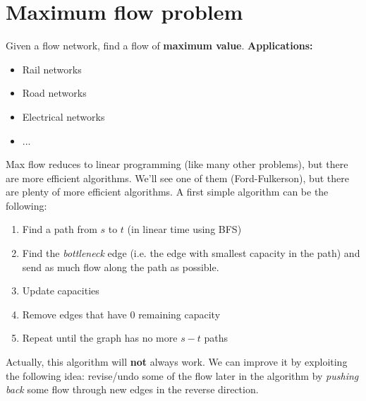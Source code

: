 \section{Maximum flow problem}
Given a flow network, find a flow of \textbf{maximum value}.\newline\newline
\textbf{Applications:}
\begin{itemize}
    \item Rail networks
    \item Road networks
    \item Electrical networks
    \item ...
\end{itemize}
Max flow reduces to linear programming (like many other problems), but there are more efficient algorithms. We'll see one of them (Ford-Fulkerson), but there are plenty of more efficient algorithms. \newline\newline
A first simple algorithm can be the following:
\begin{enumerate}
    \item Find a path from $s$ to $t$ (in linear time using BFS)
    \item Find the \textit{bottleneck} edge (i.e. the edge with smallest capacity in the path) and send as much flow along the path as possible.
    \item Update capacities
    \item Remove edges that have 0 remaining capacity
    \item Repeat until the graph has no more $s-t$ paths
\end{enumerate}
Actually, this algorithm will \textbf{not} always work. We can improve it by exploiting the following idea: revise/undo some of the flow later in the algorithm by \textit{pushing back} some flow through new edges in the reverse direction.

